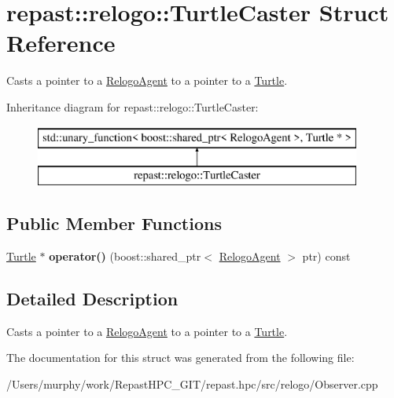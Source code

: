 \hypertarget{structrepast_1_1relogo_1_1_turtle_caster}{\section{repast\-:\-:relogo\-:\-:Turtle\-Caster Struct Reference}
\label{structrepast_1_1relogo_1_1_turtle_caster}
}


Casts a pointer to a \hyperlink{classrepast_1_1relogo_1_1_relogo_agent}{Relogo\-Agent} to a pointer to a \hyperlink{classrepast_1_1relogo_1_1_turtle}{Turtle}.  


Inheritance diagram for repast\-:\-:relogo\-:\-:Turtle\-Caster\-:\begin{figure}[H]
\begin{center}
\leavevmode
\includegraphics[height=2.000000cm]{structrepast_1_1relogo_1_1_turtle_caster}
\end{center}
\end{figure}
\subsection*{Public Member Functions}
\begin{DoxyCompactItemize}
\item 
\hypertarget{structrepast_1_1relogo_1_1_turtle_caster_add4a29ddb40cbe28574689d9f5212a1e}{\hyperlink{classrepast_1_1relogo_1_1_turtle}{Turtle} $\ast$ {\bfseries operator()} (boost\-::shared\-\_\-ptr$<$ \hyperlink{classrepast_1_1relogo_1_1_relogo_agent}{Relogo\-Agent} $>$ ptr) const }\label{structrepast_1_1relogo_1_1_turtle_caster_add4a29ddb40cbe28574689d9f5212a1e}

\end{DoxyCompactItemize}


\subsection{Detailed Description}
Casts a pointer to a \hyperlink{classrepast_1_1relogo_1_1_relogo_agent}{Relogo\-Agent} to a pointer to a \hyperlink{classrepast_1_1relogo_1_1_turtle}{Turtle}. 

The documentation for this struct was generated from the following file\-:\begin{DoxyCompactItemize}
\item 
/\-Users/murphy/work/\-Repast\-H\-P\-C\-\_\-\-G\-I\-T/repast.\-hpc/src/relogo/Observer.\-cpp\end{DoxyCompactItemize}
